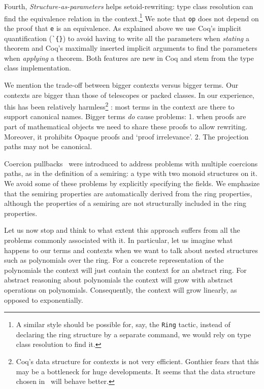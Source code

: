 \documentclass[a4paper,10pt,runningheads]{llncs}
\begin{document}
Fourth, \emph{Structure-as-parameters} helps setoid-rewriting: type class resolution
can find the equivalence relation in the context.\footnote{
A similar style should be possible for, say, the \lstinline|Ring| tactic, instead of
declaring the ring structure by a separate command, we would rely on type class resolution to find it.}
We note that \lstinline|op| does not depend on the proof that \lstinline|e| is an equivalence. As explained above we use Coq's implicit quantification (\lstinline|`{}|) to avoid having to write all the parameters when \emph{stating} a theorem and Coq's maximally inserted implicit arguments to find the parameters when \emph{applying} a theorem. Both features are new in Coq and stem from the type class implementation.

We mention the trade-off between bigger contexts versus bigger terms. Our contexts are bigger than
those of telescopes or packed classes. In our experience, this has been relatively
harmless\footnote{Coq's data structure for contexts is not very efficient. Gonthier fears that this
may be a bottleneck for huge developments. It seems that the data structure chosen
in~\cite{asperti2009compact} will behave better.}%
: most terms in the context are there to support canonical names. Bigger terms
\emph{do} cause problems: 1. when proofs are part of mathematical objects we need to share these
proofs to allow rewriting. Moreover, it prohibits Opaque proofs and `proof irrelevance'. 2. The
projection paths may not be canonical.

Coercion pullbacks~\cite{Hints} were introduced to address problems with multiple coercions paths,
as in the definition of a semiring: a type with two monoid structures on it. We avoid some
of these problems by explicitly specifying the fields. We emphasize that the semiring properties are
automatically derived from the ring properties, although the properties of a semiring are not
structurally included in the ring properties.

Let us now stop and think to what extent this approach suffers from all the problems commonly
associated with it. In particular, let us imagine what happens to our terms and contexts when we
want to talk about nested structures such as polynomials over the ring. For a concrete
representation of the polynomials the context will just contain the context for an abstract ring.
For abstract reasoning about polynomials the context will grow with abstract operations on
polynomials. Consequently, the context will grow linearly, as opposed to exponentially.
\end{document}

